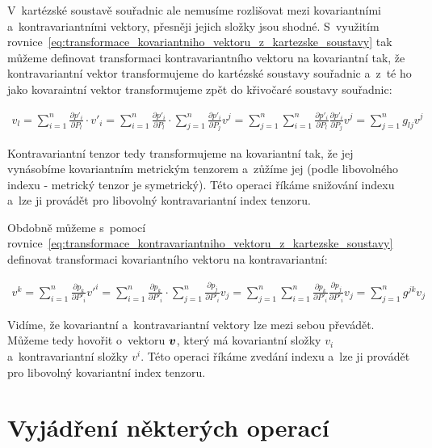 V~kartézské soustavě souřadnic ale nemusíme rozlišovat mezi kovariantními a~kontravariantními vektory, přesněji jejich složky jsou shodné. S~využitím rovnice~\eqref{eq:transformace_kovariantniho_vektoru_z_kartezske_soustavy} tak můžeme definovat transformaci kontravariantního vektoru na kovariantní tak, že kontravariantní vektor transformujeme do kartézské soustavy souřadnic a~z~té ho jako kovaraintní vektor transformujeme zpět do křivočaré soustavy souřadnic:

\begin{equation}
\begin{split}
v_l = \sum_{i=1}^n \frac{\partial p'_i}{\partial P_l} \cdot v'_i = \sum_{i=1}^n \frac{\partial p'_i}{\partial P_l} \cdot \sum_{j=1}^n \frac{\partial p'_i}{\partial P_j} v^j = \sum_{j=1}^n \sum_{i=1}^n \frac{\partial p'_i}{\partial P_l} \frac{\partial p'_i}{\partial P_j} v^j = \sum_{j=1}^n g_{lj} v^j
\end{split}
\end{equation}

Kontravariantní tenzor tedy transformujeme na kovariantní tak, že jej vynásobíme kovariantním metrickým tenzorem a~zůžíme jej (podle libovolného indexu - metrický tenzor je symetrický). Této operaci říkáme snižování indexu a~lze ji provádět pro libovolný kontravariantní index tenzoru.

Obdobně můžeme s~pomocí rovnice~\eqref{eq:transformace_kontravariantniho_vektoru_z_kartezske_soustavy} definovat transformaci kovariantního vektoru na kontravariantní:

\begin{equation}
\begin{split}
v^k = \sum_{i=1}^n \frac{\partial p_k}{\partial P'_i} v'^i = \sum_{i=1}^n \frac{\partial p_k}{\partial P'_i} \cdot \sum_{j=1}^n \frac{\partial p_j}{\partial P'_i} v_j = \sum_{j=1}^n \sum_{i=1}^n \frac{\partial p_k}{\partial P'_i} \frac{\partial p_j}{\partial P'_i} v_j = \sum_{j=1}^n g^{jk} v_j
\end{split}
\end{equation}

Vidíme, že kovariantní a~kontravariantní vektory lze mezi sebou převádět. Můžeme tedy hovořit o~vektoru \(\boldsymbol{v}\), který má kovariantní složky \(v_i\) a~kontravariantní složky \(v^i\). Této operaci říkáme zvedání indexu a~lze ji provádět pro libovolný kovariantní index tenzoru.

\section{Vyjádření některých operací}

